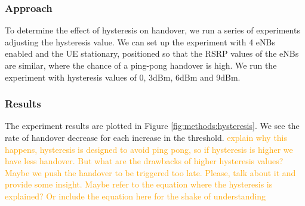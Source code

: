 \subsubsection{Approach}
To determine the effect of hysteresis on handover, we run a series of experiments adjusting the hysteresis value. We can set up the experiment with 4 eNBs enabled and the UE stationary, positioned so that the RSRP values of the eNBs are similar, where the chance of a ping-pong handover is high. We run the experiment with hysteresis values of 0, 3dBm, 6dBm and 9dBm.

\subsubsection{Results}
The experiment results are plotted in Figure \ref{fig:methods:hysteresis}. We see the rate of handover decrease for each increase in the threshold. \textcolor{orange}{explain why this happens, hysteresis is designed to avoid ping pong, so if hysteresis is higher we have less handover. But what are the drawbacks of higher hysteresis values? Maybe we push the handover to be triggered too late. Please, talk about it and provide some insight. Maybe refer to the equation where the hysteresis is explained? Or include the equation here for the shake of understanding}

